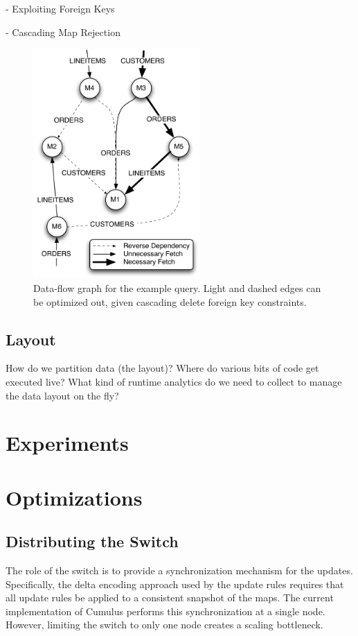 \documentclass{sig-alternate}
\begin{document}
- Exploiting Foreign Keys

- Cascading Map Rejection

\begin{figure}
\begin{center}
\includegraphics[width=2.5in]{images/q12_graph.pdf}
\caption{Data-flow graph for the example query.  Light and dashed edges can be optimized out, given cascading delete foreign key constraints.}
\label{fig:dataflow}
\end{center}
\end{figure}

\subsection{Layout}
How do we partition data (the layout)?  Where do various bits of code get executed live?  What kind of runtime analytics do we need to collect to manage the data layout on the fly? 


\section{Experiments}
\label{sec:experiments}

\section{Optimizations}
\label{sec:optimizations}

\subsection{Distributing the Switch}
\label{sec:distswitch}
The role of the switch is to provide a synchronization mechanism for the updates.  Specifically, the delta encoding approach used by the update rules requires that all update rules be applied to a consistent snapshot of the maps.  The current implementation of Cumulus performs this synchronization at a single node.  However, limiting the switch to only one node creates a scaling bottleneck.  
\end{document}
